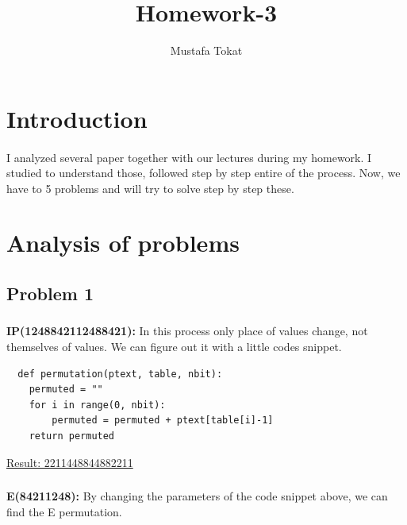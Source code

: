 \documentclass[11pt]{article}
\begin{document}
\title{Homework-3}
\author{Mustafa Tokat}
\maketitle
\section{Introduction}

\paragraph{}I analyzed several paper together with our lectures during my homework. I studied to understand those, followed step by step entire of the process.
 Now, we have to 5 problems and will try to solve step by step these.
\section{Analysis of problems}
\subsection{Problem 1}

\subsubsection{}
\paragraph{}\textbf{IP(1248842112488421):}
In this process only place of values change, not themselves of values. We can figure out it with a little codes snippet.
\lstset{language=Python}
\lstset{frame=lines}
\lstset{basicstyle=\footnotesize}
\begin{lstlisting}
  def permutation(ptext, table, nbit):
    permuted = ""
    for i in range(0, nbit):
        permuted = permuted + ptext[table[i]-1]
    return permuted
\end{lstlisting}
\bigskip\underline{Result: 2211448844882211 }\\
\newpage\subsubsection{}
\textbf{E(84211248): }
By changing the parameters of the code snippet above, we can find the E permutation.\\
\end{document}
